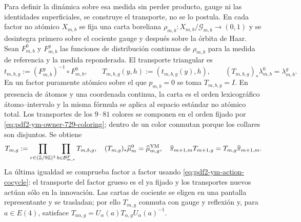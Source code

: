 Para definir la dinámica sobre esa medida sin perder producto, gauge ni las
identidades superficiales, se construye el transporte, no se lo postula. En cada
factor no atómico $X_{m,b}$ se fija una carta boreliana
$\rho_{m,b}:X_{m,b}/\mathcal G_{m,b}\to(0,1)$ y se desintegra primero sobre el
cociente gauge y después sobre la órbita de Haar. Sean $F_{m,b}^0$ y
$F_{m,b}^g$ las funciones de distribución continuas de $\rho_{m,b}$ para la
medida de referencia y la medida reponderada. El transporte triangular es
\begin{equation}\label{eq:pdf2-ym-gibbs-transport-factor}
 t_{m,b,g}:=(F_{m,b}^g)^{-1}\circ F_{m,b}^0,
 \qquad
 T_{m,b,g}(y,h):=(t_{m,b,g}(y),h),
 \qquad
 (T_{m,b,g})_*\lambda_{m,b}^0=\lambda_{m,b}^g.
\end{equation}
En un factor puramente atómico sobre el que $p_{m,b}=0$ se toma
$T_{m,b,g}=I$. En presencia de átomos y una coordenada continua, la carta es el
orden lexicográfico átomo--intervalo y la misma fórmula se aplica al espacio
estándar no atómico total. Los transportes de los $9\cdot81$ colores se componen
en el orden fijado por \eqref{eq:pdf2-ym-owner-729-coloring}; dentro de un color
conmutan porque los collares son disjuntos. Se obtiene
\begin{equation}\label{eq:pdf2-ym-gibbs-transport-global}
 T_{m,g}:=\prod_{r\in(\mathbb Z/9\mathbb Z)^3}
           \prod_{b\in\mathcal B_{m,r}^{F}}T_{m,b,g},
 \quad
 (T_{m,g})_*\widehat\mu_m^0=\widehat\mu_{m,g}^{\rm YM},
 \quad
 \widehat\pi_{m+1,m}T_{m+1,g}=T_{m,g}\widehat\pi_{m+1,m}.
\end{equation}
La última igualdad se comprueba factor a factor usando
\eqref{eq:pdf2-ym-action-cocycle}: el transporte del factor grueso es el ya fijado y
los transportes nuevos actúan sólo en la innovación. Las cartas de cociente se
eligen en una pantalla representante y se trasladan; por ello $T_{m,g}$ conmuta con
gauge y reflexión y, para $a\in E(4)$, satisface
$T_{a\alpha,g}=U_\alpha(a)T_{\alpha,g}U_\alpha(a)^{-1}$.


